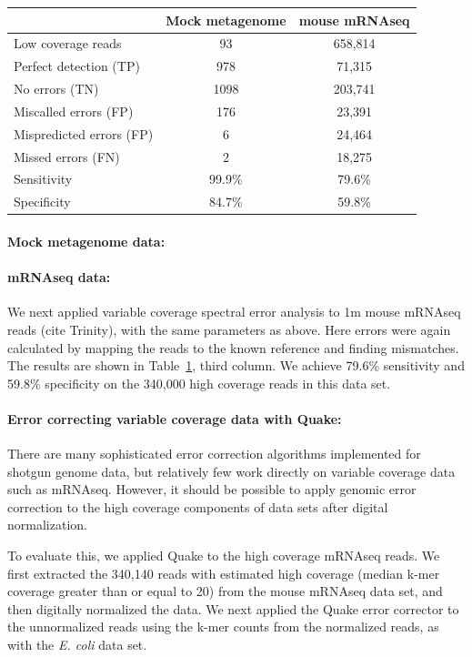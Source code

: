 \documentclass{article}
\begin{document}
\begin{table}
\begin{tabular}{|l|c||c|}
\hline
& Mock metagenome & mouse mRNAseq \\
\hline
Low coverage reads & 93 & 658,814 \\
\hline
Perfect detection (TP) & 978 & 71,315 \\
No errors (TN) & 1098 & 203,741 \\
Miscalled errors (FP) & 176 & 23,391 \\
Mispredicted errors (FP) & 6 & 24,464 \\
Missed errors (FN) & 2 & 18,275 \\
\hline
Sensitivity & 99.9\% & 79.6\% \\
Specificity & 84.7\% & 59.8\% \\
\hline
\end{tabular}
\label{tab:spectra_variable_real}
\end{table}

\paragraph{Mock metagenome data:}

\paragraph{mRNAseq data:}

We next applied variable coverage spectral error analysis to 1m mouse
mRNAseq reads (cite Trinity), with the same parameters as above.  Here
errors were again calculated by mapping the reads to the known
reference and finding mismatches. The results are shown in
Table~\ref{tab:spectra_variable_real}, third column.  We achieve
79.6\% sensitivity and 59.8\% specificity on the 340,000 high coverage
reads in this data set.

\paragraph{Error correcting variable coverage data with Quake:}

There are many sophisticated error correction algorithms implemented
for shotgun genome data, but relatively few work directly on
variable coverage data such as mRNAseq.  However, it should be possible
to apply genomic error correction to the high coverage components
of data sets after digital normalization.

To evaluate this, we applied Quake to the high coverage mRNAseq
reads.  We first extracted the 340,140 reads with estimated
high coverage (median k-mer coverage greater than or equal to 20)
from the mouse mRNAseq data set, and then digitally normalized the
data.  We next applied the Quake error corrector to the unnormalized
reads using the k-mer counts from the normalized reads, as with the
{\em E. coli} data set.
\end{document}
